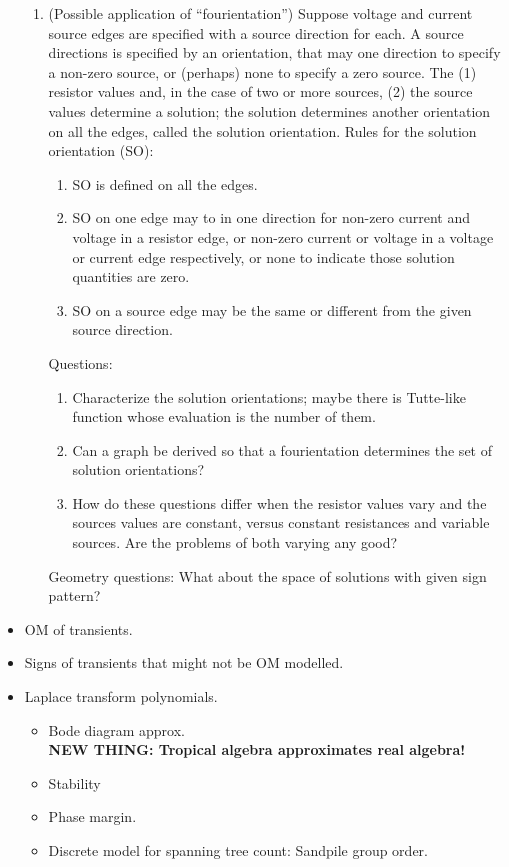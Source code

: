 \documentclass{article}
\begin{document}
\begin{itemize}
\begin{enumerate}
\item (Possible application of ``fourientation'') 
Suppose voltage and current source edges are specified with a source 
direction for each.  A source directions is specified by an orientation, that
may one direction to specify a non-zero source, or (perhaps) none to specify a
zero source.  The (1) resistor values and, in the case of two or more sources,
(2) the source values determine a solution; the solution determines another 
orientation on all the edges, called the solution orientation.  Rules for the
solution orientation (SO):
\begin{enumerate}
\item SO is defined on all the edges.
\item SO on one edge may to in one direction for non-zero current and voltage 
in a resistor edge, or non-zero current or voltage in a voltage or current edge
respectively, or none to indicate those solution quantities are zero.
\item SO on a source edge may be the same or different from the given source 
direction.
\end{enumerate}
Questions:
\begin{enumerate}
\item Characterize the solution orientations; maybe there is Tutte-like function
whose evaluation is the number of them.
\item Can a graph be derived so that a fourientation determines the set of 
solution orientations?  
\item How do these questions differ when the resistor values vary and the 
sources values are constant, versus constant resistances and variable sources.
Are the problems of both varying any good?
\end{enumerate}
Geometry questions:  What about the space of solutions with given sign pattern?
\end{enumerate}
\item OM of transients.
\item Signs of transients that might not be OM modelled.
\item Laplace transform polynomials.
\begin{itemize}
\item Bode diagram approx.\\
\textbf{NEW THING: Tropical algebra approximates real algebra!}
\item Stability
\item Phase margin.
\item Discrete model for spanning tree count: Sandpile group order.
\end{itemize}


\end{itemize}
\end{document}
